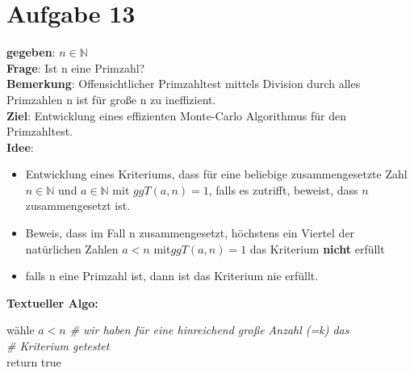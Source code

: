 \documentclass[10pt,a4paper]{article}
\begin{document}
\section*{Aufgabe 13}
    \textbf{gegeben}: $n \in \mathbb{N}$ \\
    \textbf{Frage}: Ist n eine Primzahl? \\
    \textbf{Bemerkung}:  Offensichtlicher Primzahltest mittels Division durch alles Primzahlen n ist für große n zu ineffizient.\\
    \textbf{Ziel}: Entwicklung eines effizienten Monte-Carlo Algorithmus für den Primzahltest.\\
    \textbf{Idee}:
    \begin{itemize}
        \item 
            Entwicklung eines Kriteriums, dass für eine beliebige zusammengesetzte Zahl $n \in \mathbb{N} $ 
            und $a \in \mathbb{N}$ mit $ggT(a,n)=1$, falls es zutrifft, beweist, dass $n$ zusammengesetzt ist.
        \item
            Beweis, dass im Fall n zusammengesetzt, höchstens ein Viertel der 
            natürlichen Zahlen $a<n$ mit$ ggT(a,n)=1$ das Kriterium \textbf{nicht} erfüllt
        \item
            falls n eine Primzahl ist, dann ist das Kriterium nie erfüllt.
            
    \end{itemize}
    \textbf{Textueller Algo:}\\
        \begin{algorithm}[H]
            wähle $a<n$\;
             {
             }
           \textit{ \# wir haben für eine hinreichend große Anzahl (=k) das}\\
           \textit{ \# Kriterium getestet}\\
            return true\;
                
        \end{algorithm}
\end{document}
